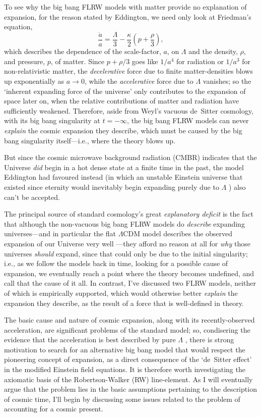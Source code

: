 \documentclass[11pt]{article}
\begin{document}
To see why the big bang FLRW models with matter provide no explanation of expansion, for the reason stated by Eddington, we need only look at Friedman's equation,
\begin{equation}
\frac{\ddot{a}}{a}=\frac{\Lambda}{3}-\frac{\kappa}{2}\left(p+\frac{\rho}{3}\right),\label{ddot_a}
\end{equation} 
which describes the dependence of the scale-factor, $a$, on $\Lambda$ and the density, $\rho$, and pressure, $p$, of matter. Since $p+\rho/3$ goes like $1/a^4$ for radiation or $1/a^3$ for non-relativistic matter, the \textit{decelerative} force due to finite matter-densities blows up exponentially as $a\rightarrow0$, while the \textit{accelerative} force due to $\Lambda$ vanishes; so the `inherent expanding force of the universe' only contributes to the expansion of space later on, when the relative contributions of matter and radiation have sufficiently weakened. Therefore, aside from Weyl's vacuous de~Sitter cosmology, with its big bang singularity at $t=-\infty$, the big bang FLRW models can never \textit{explain} the cosmic expansion they describe, which must be caused by the big bang singularity itself---i.e., where the theory blows up. 

But since the cosmic microwave background radiation (CMBR) indicates that the Universe \textit{did} begin in a hot dense state at a finite time in the past, the model Eddington had favoured instead (in which an unstable Einstein universe that existed since eternity would inevitably begin expanding purely due to $\Lambda$ \cite{Eddington1930}) also can't be accepted.

The principal source of standard cosmology's great \textit{explanatory deficit} is the fact that although the non-vacuous big bang FLRW models do \textit{describe} expanding universes---and in particular the flat $\Lambda$CDM model describes the observed expansion of our Universe very well \cite{SNe Ia}---they afford no reason at all for \textit{why} those universes \textit{should} expand, since that could only be due to the initial singularity; i.e., as we follow the models back in time, looking for a possible cause of expansion, we eventually reach a point where the theory becomes undefined, and call that the cause of it all. In contrast, I've discussed two FLRW models, neither of which is empirically supported, which would otherwise better \textit{explain} the expansion they describe, as the result of a force that is well-defined in theory.

The basic cause and nature of cosmic expansion, along with its recently-observed acceleration, are significant problems of the standard model; so, condisering the evidence that the acceleration is best described by pure $\Lambda$ \cite{SNe Ia}, there is strong motivation to search for an alternative big bang model that would respect the pioneering concept of expansion, as a direct consequence of the `de~Sitter effect' in the modified Einstein field equations. It is therefore worth investigating the axiomatic basis of the Robertson-Walker (RW) line-element. As I will eventually argue that the problem lies in the basic assumptions pertaining to the description of cosmic time, I'll begin by discussing some issues related to the problem of accounting for a cosmic present.
\end{document}
